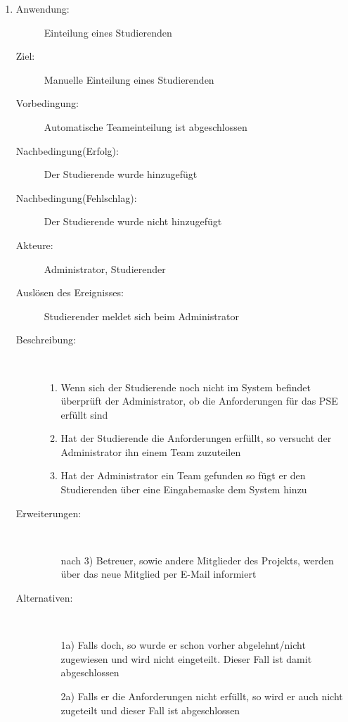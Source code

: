 \documentclass[parskip=full]{scrartcl}
\newcommand{\swtLabel}[1]{\textbf{\textbackslash #1\arabic*0\textbackslash}}
\begin{document}
\begin{enumerate} [label=\swtLabel{A}]
  
  \item
  \begin{description}
  \item[Anwendung:] Einteilung eines Studierenden
  \item[Ziel:] Manuelle Einteilung eines Studierenden
  	\item[Vorbedingung:] Automatische Teameinteilung ist abgeschlossen
  	\item[Nachbedingung(Erfolg):] Der Studierende wurde hinzugefügt
  	\item[Nachbedingung(Fehlschlag):] Der Studierende wurde nicht hinzugefügt
  	\item[Akteure:] Administrator, Studierender
  	\item[Auslösen des Ereignisses:] Studierender meldet sich beim Administrator
  	\item[Beschreibung:]~
  	 \begin{enumerate} 
  	   \item Wenn sich der Studierende noch nicht im System befindet überprüft der
  	   Administrator, ob die Anforderungen für das PSE erfüllt sind
  	   \item Hat der Studierende die Anforderungen erfüllt, so versucht der
  	   Administrator ihn einem Team zuzuteilen
  	   \item Hat der Administrator ein Team gefunden so fügt er den Studierenden
  	   über eine Eingabemaske dem System hinzu
  	 \end{enumerate}
  	\item[Erweiterungen:]~
  	 \begin{enumerate}
  	   \item [nach 3)] Betreuer, sowie andere Mitglieder des Projekts, werden
  	   über das neue Mitglied per E-Mail informiert 
  	 \end{enumerate}  
  	\item[Alternativen:] ~
  	 \begin{enumerate}
  	  \item[1a)] Falls doch, so wurde er schon vorher abgelehnt/nicht zugewiesen
  	  und wird nicht eingeteilt. Dieser Fall ist damit abgeschlossen
  	  \item [2a)] Falls er die Anforderungen nicht erfüllt, so wird er auch nicht
  	  zugeteilt und dieser Fall ist abgeschlossen
  	 \end{enumerate}  
  \end{description}
   

\end{enumerate}
\end{document}
